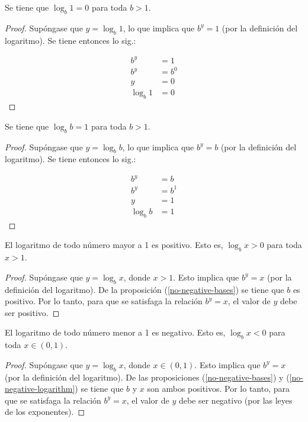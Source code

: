 \begin{prop}
Se tiene que $\log_{b}1=0$ para toda $b>1$.
\end{prop}
\begin{proof}
Supóngase que $y=\log_{b}1$, lo que implica que $b^{y}=1$ (por la
definición del logaritmo). Se tiene entonces lo sig.:

\begin{align*}
b^{y} & =1\\
b^{y} & =b^{0}\\
y & =0\\
\log_{b}1 & =0
\end{align*}
\end{proof}
\begin{prop}
Se tiene que $\log_{b}b=1$ para toda $b>1$.
\end{prop}
\begin{proof}
Supóngase que $y=\log_{b}b$, lo que implica que $b^{y}=b$ (por la
definición del logaritmo). Se tiene entonces lo sig.:

\begin{align*}
b^{y} & =b\\
b^{y} & =b^{1}\\
y & =1\\
\log_{b}b & =1
\end{align*}
\end{proof}
\begin{prop}
El logaritmo de todo número mayor a 1 es positivo. Esto es, $\log_{b}x>0$
para toda $x>1$.
\end{prop}
\begin{proof}
Supóngase que $y=\log_{b}x$, donde $x>1$. Esto implica que $b^{y}=x$
(por la definición del logaritmo). De la proposición (\ref{no-negative-bases})
se tiene que $b$ es positivo. Por lo tanto, para que se satisfaga
la relación $b^{y}=x$, el valor de $y$ debe ser positivo. 
\end{proof}
%
\begin{prop}
El logaritmo de todo número menor a 1 es negativo. Esto es, $\log_{b}x<0$
para toda $x\in(0,1)$.
\end{prop}
\begin{proof}
Supóngase que $y=\log_{b}x$, donde $x\in(0,1)$. Esto implica que
$b^{y}=x$ (por la definición del logaritmo). De las proposiciones
(\ref{no-negative-bases}) y (\ref{no-negative-logarithm}) se tiene
que $b$ y $x$ son ambos positivos. Por lo tanto, para que se satisfaga
la relación $b^{y}=x$, el valor de $y$ debe ser negativo (por las
leyes de los exponentes).
\end{proof}

